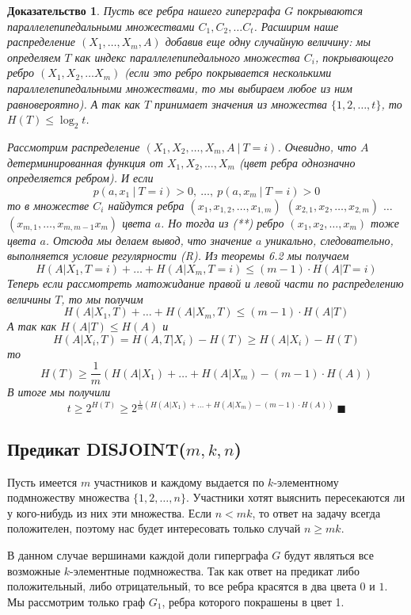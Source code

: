 \documentclass[a4paper]{article}
\newtheorem*{msolution}{Доказательство}
\begin{document}
\begin{msolution}
    Пусть все ребра нашего гиперграфа $G$ покрываются параллелепипедальными множествами $C_1, C_2, \ldots C_t$.
    Расширим наше распределение $(X_1, \ldots, X_m, A)$ добавив еще одну случайную величину: мы определяем $T$ 
    как индекс параллелепипедального множества $C_i$, покрывающего ребро $(X_1, X_2, \ldots X_m)$ (если это ребро 
    покрывается несколькими параллелепипедальными множествами, то мы выбираем любое из ним равновероятно). 
    А так как $T$ принимает значения из множества $\{1, 2, \ldots, t\}$, то $H(T) \leq \log_2t$.
    
    Рассмотрим распределение $(X_1, X_2,\ldots,X_m,A\ |\ T = i)$. Очевидно, что $A$ детерминированная 
    функция от $X_1, X_2,\ldots,X_m$ (цвет ребра однозначно определяется ребром). И если 
    $$p(a, x_1\ |\ T = i) > 0,\ \ldots,\ p(a, x_m\ |\ T = i) > 0$$ то в множестве 
    $C_i$ найдутся ребра  $(x_1, x_{1,2}, \ldots, x_{1,m})$ 
    $(x_{2,1}, x_2, \ldots, x_{2,m})$ $\ldots$ $(x_{m,1}, \ldots, x_{m, m-1} x_m)$ цвета $a$. Но тогда 
    из (**) ребро $(x_1, x_2, \ldots, x_m)$ тоже цвета $a$. Отсюда мы делаем вывод, что значение $a$ 
    уникально, следовательно, выполняется условие регулярности (R). Из теоремы 6.2 мы получаем 
    $$H(A|X_1, T=i) + \ldots + H(A|X_m, T=i) \leq (m-1)\cdot H(A|T=i)$$ Теперь если рассмотреть 
    матожидание правой и левой части по распределению величины $T$, то мы получим 
    $$H(A|X_1, T) + \ldots + H(A|X_m, T) \leq (m-1)\cdot H(A|T)$$ А так как $H(A|T) \leq H(A)$ и $$H(A|X_i, T) = 
    H(A,T|X_i) - H(T) \geq H(A|X_i) - H(T)$$ то $$H(T) \geq \frac{1}{m}(H(A|X_1) + \ldots + H(A|X_m) - (m-1)\cdot H(A))$$
    В итоге мы получили $$t \geq 2^{H(T)} \geq 2^{\frac{1}{m}(H(A|X_1) + \ldots + H(A|X_m) - (m-1)\cdot H(A))}\ \blacksquare$$
\end{msolution}

\subsection{Предикат DISJOINT($m, k, n$)}

Пусть имеется $m$ участников и каждому выдается по $k$-элементному подмножеству множества $\{1,2,\ldots, n\}$. 
Участники хотят выяснить пересекаются ли у кого-нибудь из них эти множества. Если $n < mk$, то ответ на 
задачу всегда положителен, поэтому нас будет интересовать только случай $n \geq mk$. 

В данном случае вершинами каждой доли гиперграфа $G$ будут являться все возможные $k$-элементные подмножества.
Так как ответ на предикат либо положительный, либо отрицательный, то все ребра красятся в два цвета $0$ и $1$. 
Мы рассмотрим только граф $G_1$, ребра которого покрашены в цвет 1. 
\end{document}
